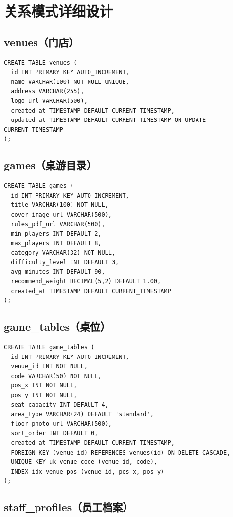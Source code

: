 \section{关系模式详细设计}

\subsection{venues（门店）}

\begin{verbatim}
CREATE TABLE venues (
  id INT PRIMARY KEY AUTO_INCREMENT,
  name VARCHAR(100) NOT NULL UNIQUE,
  address VARCHAR(255),
  logo_url VARCHAR(500),
  created_at TIMESTAMP DEFAULT CURRENT_TIMESTAMP,
  updated_at TIMESTAMP DEFAULT CURRENT_TIMESTAMP ON UPDATE CURRENT_TIMESTAMP
);
\end{verbatim}

\subsection{games（桌游目录）}

\begin{verbatim}
CREATE TABLE games (
  id INT PRIMARY KEY AUTO_INCREMENT,
  title VARCHAR(100) NOT NULL,
  cover_image_url VARCHAR(500),
  rules_pdf_url VARCHAR(500),
  min_players INT DEFAULT 2,
  max_players INT DEFAULT 8,
  category VARCHAR(32) NOT NULL,
  difficulty_level INT DEFAULT 3,
  avg_minutes INT DEFAULT 90,
  recommend_weight DECIMAL(5,2) DEFAULT 1.00,
  created_at TIMESTAMP DEFAULT CURRENT_TIMESTAMP
);
\end{verbatim}

\subsection{game\_tables（桌位）}

\begin{verbatim}
CREATE TABLE game_tables (
  id INT PRIMARY KEY AUTO_INCREMENT,
  venue_id INT NOT NULL,
  code VARCHAR(50) NOT NULL,
  pos_x INT NOT NULL,
  pos_y INT NOT NULL,
  seat_capacity INT DEFAULT 4,
  area_type VARCHAR(24) DEFAULT 'standard',
  floor_photo_url VARCHAR(500),
  sort_order INT DEFAULT 0,
  created_at TIMESTAMP DEFAULT CURRENT_TIMESTAMP,
  FOREIGN KEY (venue_id) REFERENCES venues(id) ON DELETE CASCADE,
  UNIQUE KEY uk_venue_code (venue_id, code),
  INDEX idx_venue_pos (venue_id, pos_x, pos_y)
);
\end{verbatim}

\subsection{staff\_profiles（员工档案）}

